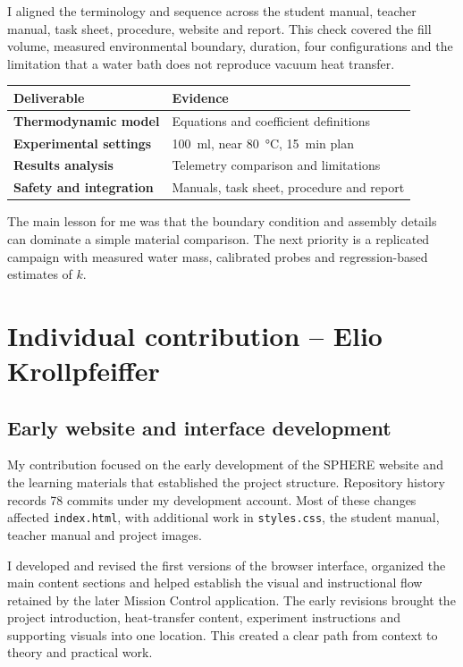 \documentclass[9pt,a4paper]{extarticle}
\begin{document}
I aligned the terminology and sequence across the student manual, teacher manual, task sheet, procedure, website and report. This check covered the fill volume, measured environmental boundary, duration, four configurations and the limitation that a water bath does not reproduce vacuum heat transfer.

\begin{center}\small
\begin{tabularx}{0.86\textwidth}{@{}>{\bfseries}p{}X@{}}
\toprule
Deliverable & Evidence \\
\midrule
Thermodynamic model & Equations and coefficient definitions \\
Experimental settings & \SI{100}{\milli\litre}, near \SI{80}{\celsius}, \SI{15}{\minute} plan \\
Results analysis & Telemetry comparison and limitations \\
Safety and integration & Manuals, task sheet, procedure and report \\
\bottomrule
\end{tabularx}
\end{center}

The main lesson for me was that the boundary condition and assembly details can dominate a simple material comparison. The next priority is a replicated campaign with measured water mass, calibrated probes and regression-based estimates of $k$.

\clearpage
\section*{Individual contribution -- Elio Krollpfeiffer}
\subsection*{Early website and interface development}
My contribution focused on the early development of the SPHERE website and the learning materials that established the project structure. Repository history records 78 commits under my development account. Most of these changes affected \texttt{index.html}, with additional work in \texttt{styles.css}, the student manual, teacher manual and project images.

I developed and revised the first versions of the browser interface, organized the main content sections and helped establish the visual and instructional flow retained by the later Mission Control application. The early revisions brought the project introduction, heat-transfer content, experiment instructions and supporting visuals into one location. This created a clear path from context to theory and practical work.
\end{document}
